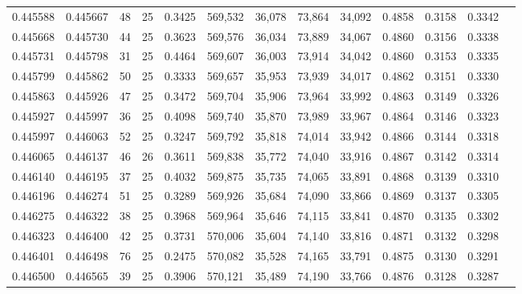 \begin{tabular}{rrrrrrrrrrrrr}
0.445588 & 0.445667 &    48 &  25 &                                     0.3425 & 569,532 &  36,078 &  73,864 &  34,092 & 0.4858 & 0.3158 & 0.3342 \\
0.445668 & 0.445730 &    44 &  25 &                                     0.3623 & 569,576 &  36,034 &  73,889 &  34,067 & 0.4860 & 0.3156 & 0.3338 \\
0.445731 & 0.445798 &    31 &  25 &                                     0.4464 & 569,607 &  36,003 &  73,914 &  34,042 & 0.4860 & 0.3153 & 0.3335 \\
0.445799 & 0.445862 &    50 &  25 &                                     0.3333 & 569,657 &  35,953 &  73,939 &  34,017 & 0.4862 & 0.3151 & 0.3330 \\
0.445863 & 0.445926 &    47 &  25 &                                     0.3472 & 569,704 &  35,906 &  73,964 &  33,992 & 0.4863 & 0.3149 & 0.3326 \\
0.445927 & 0.445997 &    36 &  25 &                                     0.4098 & 569,740 &  35,870 &  73,989 &  33,967 & 0.4864 & 0.3146 & 0.3323 \\
0.445997 & 0.446063 &    52 &  25 &                                     0.3247 & 569,792 &  35,818 &  74,014 &  33,942 & 0.4866 & 0.3144 & 0.3318 \\
0.446065 & 0.446137 &    46 &  26 &                                     0.3611 & 569,838 &  35,772 &  74,040 &  33,916 & 0.4867 & 0.3142 & 0.3314 \\
0.446140 & 0.446195 &    37 &  25 &                                     0.4032 & 569,875 &  35,735 &  74,065 &  33,891 & 0.4868 & 0.3139 & 0.3310 \\
0.446196 & 0.446274 &    51 &  25 &                                     0.3289 & 569,926 &  35,684 &  74,090 &  33,866 & 0.4869 & 0.3137 & 0.3305 \\
0.446275 & 0.446322 &    38 &  25 &                                     0.3968 & 569,964 &  35,646 &  74,115 &  33,841 & 0.4870 & 0.3135 & 0.3302 \\
0.446323 & 0.446400 &    42 &  25 &                                     0.3731 & 570,006 &  35,604 &  74,140 &  33,816 & 0.4871 & 0.3132 & 0.3298 \\
0.446401 & 0.446498 &    76 &  25 &                                     0.2475 & 570,082 &  35,528 &  74,165 &  33,791 & 0.4875 & 0.3130 & 0.3291 \\
0.446500 & 0.446565 &    39 &  25 &                                     0.3906 & 570,121 &  35,489 &  74,190 &  33,766 & 0.4876 & 0.3128 & 0.3287 \\

\end{tabular}
